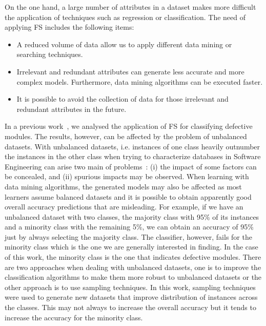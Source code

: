 \documentclass{elsart}
\begin{document}
On the one hand, a large number of attributes in a dataset makes more difficult the application of techniques such as regression or classification. The need of applying FS includes the following items:
\begin{itemize}
  \item A reduced volume of data allow us to apply different data mining or searching techniques.

  \item Irrelevant and redundant attributes can generate less accurate and more complex models. Furthermore, data mining algorithms can be executed faster.

  \item It is possible to avoid the collection of data for those irrelevant and redundant attributes in the future.
\end{itemize}

In a previous work~\cite{Rodriguez2007AttSelection}, we analysed the application of FS for classifying defective modules. The results, however, can be affected by the problem of unbalanced datasets. With unbalanced datasets, i.e. instances of one class heavily outnumber the instances in the other class when trying to characterize databases in Software Engineering can arise two main of problems~\cite{Kitchenham2007UnbalancedDS}: (i) the impact of some factors can be concealed, and (ii) spurious impacts may be observed. When learning with data mining algorithms, the generated models may also be affected as most learners assume balanced datasets and it is possible to obtain apparently good overall accuracy predictions that are misleading. For example, if we have an unbalanced dataset with two classes, the majority class with 95\% of its instances and a minority class with the remaining 5\%, we can obtain an accuracy of 95\% just by always selecting the majority class. The classifier, however, fails for the minority class which is the one we are generally interested in finding. In the case of this work, the minority class is the one that indicates defective modules. There are two approaches when dealing with unbalanced datasets, one is to improve the classification algorithms to make them more robust to unbalanced datasets or the other approach is to use sampling techniques. In this work, sampling techniques were used to generate new datasets that improve distribution of instances across the classes. This may not always to increase the overall accuracy but it tends to increase the accuracy for the minority class.
\end{document}

